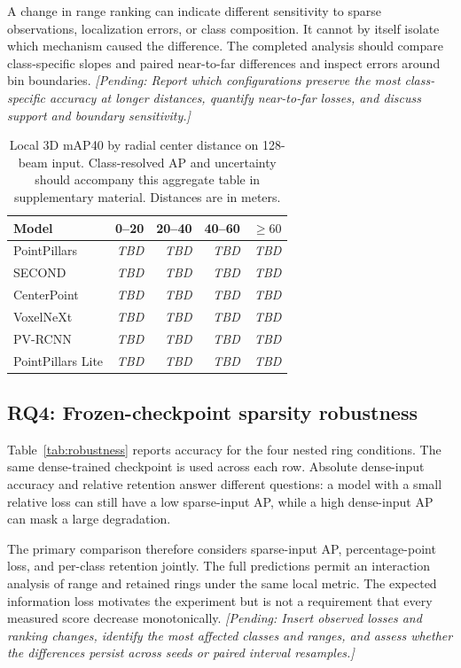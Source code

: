 \documentclass[10pt,twocolumn]{article}
\newcommand{\TBD}{\textit{TBD}}
\newcommand{\pending}[1]{\textcolor{blue!55!black}{\textit{[Pending: #1]}}}
\begin{document}
A change in range ranking can indicate different sensitivity to sparse observations, localization errors, or class composition. It cannot by itself isolate which mechanism caused the difference. The completed analysis should compare class-specific slopes and paired near-to-far differences and inspect errors around bin boundaries. \pending{Report which configurations preserve the most class-specific accuracy at longer distances, quantify near-to-far losses, and discuss support and boundary sensitivity.}

\begin{table}[t]
\centering\small
\caption{Local 3D mAP40 by radial center distance on 128-beam input. Class-resolved AP and uncertainty should accompany this aggregate table in supplementary material. Distances are in meters.}
\label{tab:range}
\begin{tabular}{lrrrr}
\toprule
Model & 0--20 & 20--40 & 40--60 & $\geq60$\\
\midrule
PointPillars & \TBD & \TBD & \TBD & \TBD\\
SECOND & \TBD & \TBD & \TBD & \TBD\\
CenterPoint & \TBD & \TBD & \TBD & \TBD\\
VoxelNeXt & \TBD & \TBD & \TBD & \TBD\\
PV-RCNN & \TBD & \TBD & \TBD & \TBD\\
PointPillars Lite & \TBD & \TBD & \TBD & \TBD\\
\bottomrule
\end{tabular}
\end{table}

\subsection{RQ4: Frozen-checkpoint sparsity robustness}
Table~\ref{tab:robustness} reports accuracy for the four nested ring conditions. The same dense-trained checkpoint is used across each row. Absolute dense-input accuracy and relative retention answer different questions: a model with a small relative loss can still have a low sparse-input AP, while a high dense-input AP can mask a large degradation.

The primary comparison therefore considers sparse-input AP, percentage-point loss, and per-class retention jointly. The full predictions permit an interaction analysis of range and retained rings under the same local metric. The expected information loss motivates the experiment but is not a requirement that every measured score decrease monotonically. \pending{Insert observed losses and ranking changes, identify the most affected classes and ranges, and assess whether the differences persist across seeds or paired interval resamples.}
\end{document}
